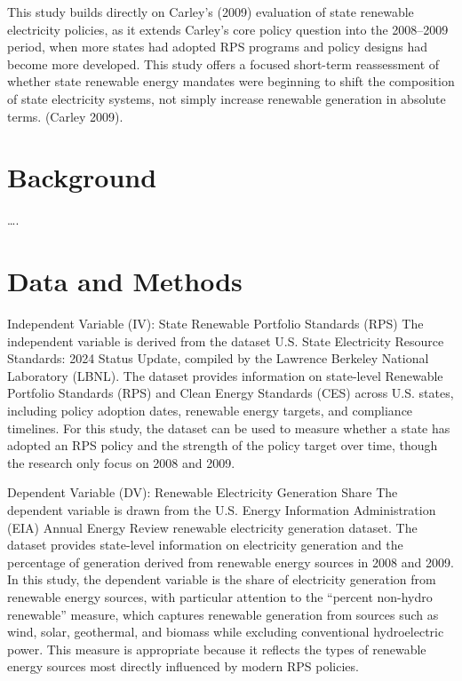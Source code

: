 \documentclass[
  12pt,
  letterpaper,
]{article}
\begin{document}
This study builds directly on Carley's (2009) evaluation of state
renewable electricity policies, as it extends Carley's core policy
question into the 2008--2009 period, when more states had adopted RPS
programs and policy designs had become more developed. This study offers
a focused short-term reassessment of whether state renewable energy
mandates were beginning to shift the composition of state electricity
systems, not simply increase renewable generation in absolute terms.
(Carley 2009).

\section{Background}\label{background}

\ldots.

\section{Data and Methods}\label{data-and-methods}

Independent Variable (IV): State Renewable Portfolio Standards (RPS) The
independent variable is derived from the dataset U.S. State Electricity
Resource Standards: 2024 Status Update, compiled by the Lawrence
Berkeley National Laboratory (LBNL). The dataset provides information on
state-level Renewable Portfolio Standards (RPS) and Clean Energy
Standards (CES) across U.S. states, including policy adoption dates,
renewable energy targets, and compliance timelines. For this study, the
dataset can be used to measure whether a state has adopted an RPS policy
and the strength of the policy target over time, though the research
only focus on 2008 and 2009.

Dependent Variable (DV): Renewable Electricity Generation Share The
dependent variable is drawn from the U.S. Energy Information
Administration (EIA) Annual Energy Review renewable electricity
generation dataset. The dataset provides state-level information on
electricity generation and the percentage of generation derived from
renewable energy sources in 2008 and 2009. In this study, the dependent
variable is the share of electricity generation from renewable energy
sources, with particular attention to the ``percent non-hydro
renewable'' measure, which captures renewable generation from sources
such as wind, solar, geothermal, and biomass while excluding
conventional hydroelectric power. This measure is appropriate because it
reflects the types of renewable energy sources most directly influenced
by modern RPS policies.
\end{document}

